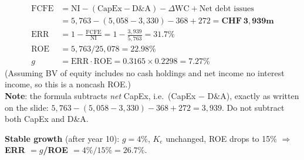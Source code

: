 \begin{exbox}
\begin{align*}
\text{FCFE}&=\text{NI}-(\text{CapEx}-\text{D\&A})-\Delta\text{WC}+\text{Net debt issues}\\&=5{,}763-(5{,}058-3{,}330)-368+272=\mathbf{CHF\ 3{,}939m}\\
\text{ERR}&=1-\frac{\text{FCFE}}{\text{NI}}=1-\frac{3{,}939}{5{,}763}=\mathbf{31.7\%}\\
\text{ROE}&=5{,}763/25{,}078=\mathbf{22.98\%}\\ g&=\text{ERR}\cdot\text{ROE}=0.3165\times0.2298=\mathbf{7.27\%}
\end{align*}
(Assuming BV of equity includes no cash holdings and net income no interest income, so this is a noncash ROE.)\\
\textbf{Note}: the formula subtracts \emph{net} CapEx, i.e.\ (CapEx $-$ D\&A), exactly as written on the slide: $5{,}763-(5{,}058-3{,}330)-368+272=3{,}939$. Do not subtract both CapEx and D\&A.

\textbf{Stable growth} (after year 10): $g=4\%$, $K_e$ unchanged, ROE drops to 15\% $\Rightarrow$ \textbf{ERR $=g$/ROE $=4\%/15\%=26.7\%$}.
\end{exbox}

